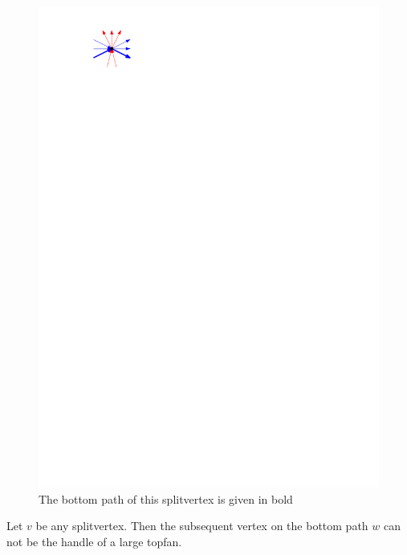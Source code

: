     \begin{figure}[h]
      \centering
      \includegraphics[scale=1]{unifiedAlgo/img/sweep/bottompath.pdf}
      \caption{The bottom path of this splitvertex is given in bold}
      \label{fig:sweep:bottomPath}
    \end{figure}

    \begin{lemma}
      \label{lm:sweep:NoTwoSplitsAboveEachOther}
      Let $v$ be any splitvertex. Then the subsequent vertex on the bottom path $w$ can not be the handle of a large topfan.
    \end{lemma}

